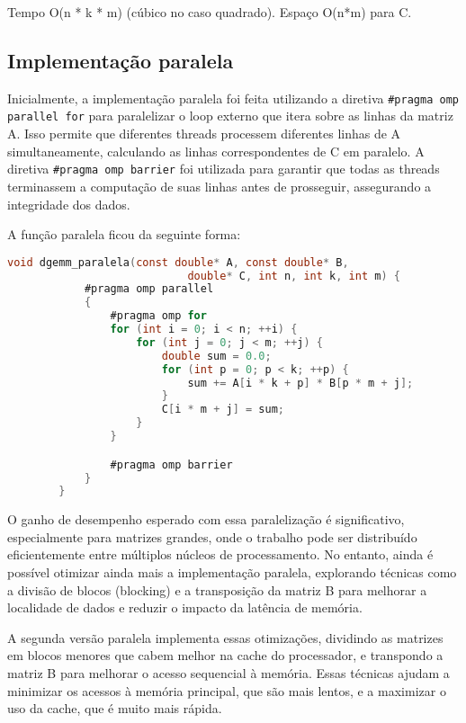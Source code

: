 \documentclass[12pt, a4paper]{article}
\begin{document}
	Tempo O(n * k * m) (cúbico no caso quadrado). Espaço O(n*m) para C.

	\subsection{Implementação paralela}
	
    Inicialmente, a implementação paralela foi feita utilizando a diretiva \texttt{\#pragma omp parallel for}
    para paralelizar o loop externo que itera sobre as linhas da matriz A. Isso
    permite que diferentes threads processem diferentes linhas de A simultaneamente,
    calculando as linhas correspondentes de C em paralelo. A diretiva \texttt{\#pragma omp barrier}
    foi utilizada para garantir que todas as threads terminassem a computação de suas
    linhas antes de prosseguir, assegurando a integridade dos dados.

    A função paralela ficou da seguinte forma:

    \begin{lstlisting}[language=C]
        void dgemm_paralela(const double* A, const double* B, 
                            double* C, int n, int k, int m) {
            #pragma omp parallel
            {
                #pragma omp for
                for (int i = 0; i < n; ++i) {
                    for (int j = 0; j < m; ++j) {
                        double sum = 0.0;
                        for (int p = 0; p < k; ++p) {
                            sum += A[i * k + p] * B[p * m + j];
                        }
                        C[i * m + j] = sum;
                    }
                }

                #pragma omp barrier
            }
        }
    \end{lstlisting}
    
    O ganho de desempenho esperado com essa paralelização é significativo, especialmente
    para matrizes grandes, onde o trabalho pode ser distribuído eficientemente entre
    múltiplos núcleos de processamento. No entanto, ainda é possível otimizar ainda mais
    a implementação paralela, explorando técnicas como a divisão de blocos (blocking)
    e a transposição da matriz B para melhorar a localidade de dados e reduzir o impacto 
    da latência de memória.

    A segunda versão paralela implementa essas otimizações, dividindo as matrizes em blocos menores
    que cabem melhor na cache do processador, e transpondo a matriz B para melhorar o acesso
    sequencial à memória. Essas técnicas ajudam a minimizar os acessos à memória principal, que são mais lentos, 
    e a maximizar o uso da cache, que é muito mais rápida.
\end{document}
